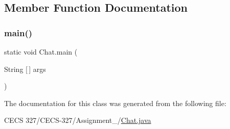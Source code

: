 \subsection{Member Function Documentation}
\hypertarget{class_chat_a04e26027ad460092250efa75ce7a8a19}{}\label{class_chat_a04e26027ad460092250efa75ce7a8a19} 
\subsubsection{\texorpdfstring{main()}{main()}}
{\footnotesize\ttfamily static void Chat.\+main (\begin{DoxyParamCaption}\item[{String \mbox{[}$\,$\mbox{]}}]{args }\end{DoxyParamCaption})\hspace{0.3cm}{\ttfamily [static]}}



The documentation for this class was generated from the following file\+:\begin{DoxyCompactItemize}
\item 
C\+E\+C\+S 327/\+C\+E\+C\+S-\/327/\+Assignment\+\_/\hyperlink{_chat_8java}{Chat.\+java}\end{DoxyCompactItemize}
